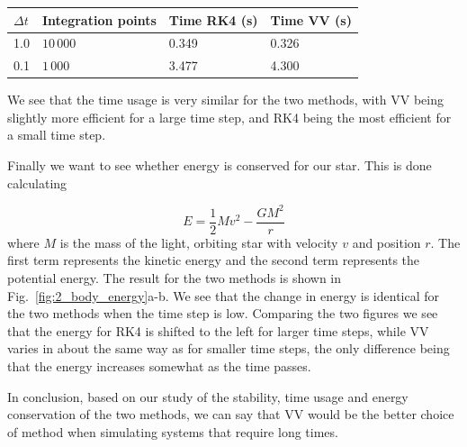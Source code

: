 \documentclass{article}
\begin{document}
\begin{multicols}{2}
\begin{center}
\begin{tabular}{ l l l l }\hline
	$\Delta t$ 				& Integration points	 	& Time RK4 (s)		& Time VV (s)		\\ \hline
	1.0 					& $10 \, 000$ 			& 0.349			& 0.326		 \\
	0.1 					& $1 \, 000$			& 3.477 			& 4.300		 \\
	\hline
\end{tabular}
\end{center}
We see that the time usage is very similar for the two methods, with VV being slightly more efficient for a large time step, and RK4 being the most efficient for a small time step. 

Finally we want to see whether energy is conserved for our star. This is done calculating

\begin{equation}\label{eq:E_tot}
	E = \frac{1}{2}Mv^2 - \frac{GM^2}{r}
\end{equation}
where $M$ is the mass of the light, orbiting star with velocity $v$ and position $r$. The first term represents the kinetic energy and the second term represents the potential energy. The result for the two methods is shown in Fig.~\ref{fig:2_body_energy}a-b. We see that the change in energy is identical for the two methods when the time step is low. Comparing the two figures we see that the energy for RK4 is shifted to the left for larger time steps, while VV varies in about the same way as for smaller time steps, the only difference being that the energy increases somewhat as the time passes. 

In conclusion, based on our study of the stability, time usage and energy conservation of the two methods, we can say that VV would be the better choice of method when simulating systems that require long times.



\end{multicols}
\end{document}

